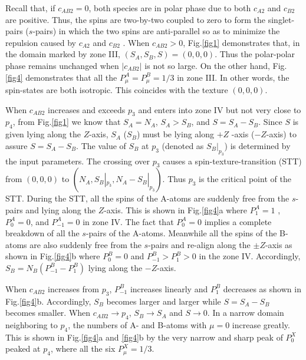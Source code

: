 \documentclass[10pt]{wlscirep}
\begin{document}
Recall that, if $c_{AB2}=0$, both species are in polar phase due to both $%
c_{A2}$ and $c_{B2}$ are positive. Thus, the spins are two-by-two coupled to
zero to form the singlet-pairs ($s$-pairs) in which the two spins are
anti-parallel so as to minimize the repulsion caused by $c_{A2}$ and $c_{B2}$%
. When $c_{AB2}>0$, Fig.\ref{fig1} demonstrates that, in the domain marked
by zone III, $(S_A,S_B,S)=(0,0,0)$. Thus the polar-polar phase remains
unchanged when $|c_{AB2}|$ is not so large. On the other hand, Fig.\ref{fig4}
demonstrates that all the $P_{\mu}^A=P_{\mu}^B=1/3$ in zone III. In other
words, the spin-states are both isotropic. This coincides with the texture $%
(0,0,0)$.

When $c_{AB2}$ increases and exceeds $p_{3}$ and enters into
zone IV but not very close to $p_{4}$, from Fig.\ref{fig1} we
know that $S_{A}=N_{A}$, $S_{A}>S_{B}$, and $S=S_{A}-S_{B}$. Since $S$ is
given lying along the $Z$-axis, $S_{A}$ ($S_{B}$) must be lying along $+Z$%
-axis ($-Z$-axis) to assure $S=S_{A}-S_{B}$. The value of $S_{B}$ at
$p_{3}$ (denoted as $S_{B}|_{p_{3}}$) is
determined by the input parameters. The crossing over $p_{3}$
causes a spin-texture-transition (STT) from $(0,0,0)$ to $(N_{A},S_{B}|_{p_{3}},N_{A}-S_{B}|_{p_{3}})$.
Thus $p_{3}$ is the critical point of the STT. During the STT, all
the spins of the A-atoms are suddenly free from the $s$-pairs and lying
along the $Z$-axis. This is shown in Fig.\ref{fig4}a where $P_{1}^{A}=1$ , $%
P_{0}^{A}=0$, and $P_{-1}^{A}=0$ in zone IV. The fact that $P_{0}^{A}=0$
implies a complete breakdown of all the $s$-pairs of the A-atoms. Meanwhile
all the spins of the B-atoms are also suddenly free from the $s$-pairs and
re-align along the $\pm Z$-axis as shown in Fig.\ref{fig4}b where $%
P_{0}^{B}=0$ and $P_{-1}^{B}>P_{1}^{B}>0$ in the zone IV. Accordingly, $%
S_{B}=N_{B}(P_{-1}^{B}-P_{1}^{B})$ lying along the $-Z$-axis.

When $c_{AB2}$ increases from $p_{3}$, $P_{-1}^{B}$ increases
linearly and $P_{1}^{B}$ decreases as shown in Fig.\ref{fig4}b. Accordingly,
$S_{B}$ becomes larger and larger while $S=S_{A}-S_{B}$ becomes smaller.
When $c_{AB2}\rightarrow p_{4}$, $S_{B}\rightarrow S_{A}$ and
$S\rightarrow 0$. In a narrow domain neighboring to $p_{4}$,
the numbers of A- and B-atoms with $\mu =0$ increase greatly. This is shown
in Fig.\ref{fig4}a and \ref{fig4}b by the very narrow and sharp peak of $%
P_{0}^{X}$ peaked at $p_{4}$, where all the six $P_{\mu
}^{X}=1/3$.
\end{document}

